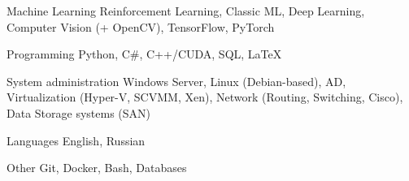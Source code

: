 

\begin{cvskills}

  \cvskill
    {Machine Learning} %
    {Reinforcement Learning, Classic ML, Deep Learning, Computer Vision (+ OpenCV), TensorFlow, PyTorch} %

  \cvskill
    {Programming} %
    {Python, C\#, C++/CUDA, SQL, LaTeX} %
    
  \cvskill
	{System administration} %
	{Windows Server, Linux (Debian-based), AD, Virtualization (Hyper-V, SCVMM, Xen), Network (Routing, Switching, Cisco), Data Storage systems (SAN)} %

  \cvskill
    {Languages} %
    {English, Russian} %

  \cvskill
	{Other} %
	{Git, Docker, Bash, Databases} %

\end{cvskills}
